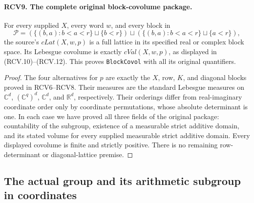\paragraph{RCV9. The complete original block-covolume package.}
\label{claim:RCV9}
For every supplied \(X\), every word \(w\), and every block in
\[
 \mathcal P=(\{(b,a):b<a<r\}\sqcup\{b<r\})
                \sqcup(\{(b,a):b<a<r\}\sqcup\{a<r\}),
\]
the source's \(cLat(X,w,p)\) is a full lattice in its specified
real or complex block space.  Its Lebesgue covolume is exactly
\(cVal(X,w,p)\), as displayed in (RCV.10)--(RCV.12).
This proves \texttt{BlockCovol} with all its original quantifiers.
\begin{proof}
The four alternatives for \(p\) are exactly the \(X\), row,
\(K\), and diagonal blocks proved in RCV6--RCV8.  Their measures
are the standard Lebesgue measures on \(\mathbb C^d\),
\((\mathbb C^q)^d\), \(\mathbb C^d\), and \(\mathbb R^d\),
respectively.  Their orderings differ from real-imaginary coordinate
order only by coordinate permutations, whose absolute determinant
is one.  In each case we have proved all three fields of the original
package: countability of the subgroup, existence of a measurable
strict additive domain, and its stated volume for every supplied
measurable strict additive domain.  Every displayed covolume is
finite and strictly positive.  There is no remaining row-determinant
or diagonal-lattice premise.
\end{proof}

\subsection{The actual group and its arithmetic subgroup in coordinates}

